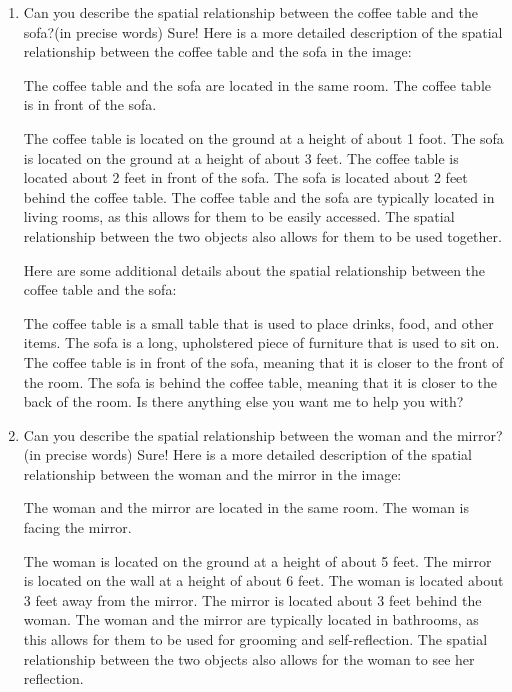 \begin{enumerate}
    \item Can you describe the spatial relationship between the coffee table and the sofa?(in precise words)
    \subitem 
    Sure! Here is a more detailed description of the spatial relationship between the coffee table and the sofa in the image:
    
    The coffee table and the sofa are located in the same room. The coffee table is in front of the sofa.
    
    The coffee table is located on the ground at a height of about 1 foot.
    The sofa is located on the ground at a height of about 3 feet.
    The coffee table is located about 2 feet in front of the sofa.
    The sofa is located about 2 feet behind the coffee table.
    The coffee table and the sofa are typically located in living rooms, as this allows for them to be easily accessed. The spatial relationship between the two objects also allows for them to be used together.
    
    Here are some additional details about the spatial relationship between the coffee table and the sofa:
    
    The coffee table is a small table that is used to place drinks, food, and other items.
    The sofa is a long, upholstered piece of furniture that is used to sit on.
    The coffee table is in front of the sofa, meaning that it is closer to the front of the room.
    The sofa is behind the coffee table, meaning that it is closer to the back of the room.
    Is there anything else you want me to help you with?
    \item Can you describe the spatial relationship between the woman and the mirror?(in precise words)
    \subitem 
    Sure! Here is a more detailed description of the spatial relationship between the woman and the mirror in the image:
    
    The woman and the mirror are located in the same room. The woman is facing the mirror.
    
    The woman is located on the ground at a height of about 5 feet.
    The mirror is located on the wall at a height of about 6 feet.
    The woman is located about 3 feet away from the mirror.
    The mirror is located about 3 feet behind the woman.
    The woman and the mirror are typically located in bathrooms, as this allows for them to be used for grooming and self-reflection. The spatial relationship between the two objects also allows for the woman to see her reflection.
    

\end{enumerate}

